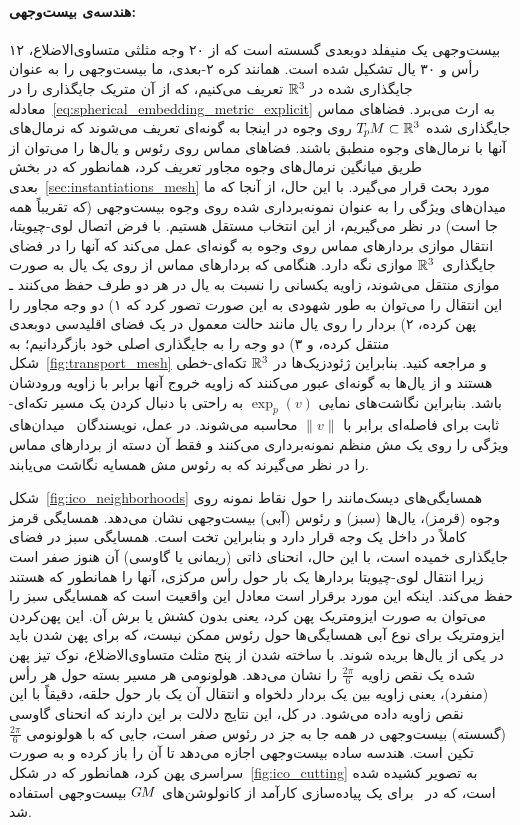 \paragraph{هندسه‌ی بیست‌وجهی:}
بیست‌وجهی یک منیفلد دوبعدی گسسته است که از ۲۰ وجه مثلثی متساوی‌الاضلاع، ۱۲ رأس و ۳۰ یال تشکیل شده است.
همانند کره ۲-بعدی، ما بیست‌وجهی را به عنوان جایگذاری شده در $\mathbb{R}^3$ تعریف می‌کنیم، که از آن متریک جایگذاری را در معادله~\eqref{eq:spherical_embedding_metric_explicit} به ارث می‌برد.
فضاهای مماس جایگذاری شده $T_{\mkern-1.5mu p}\mkern-.5muM \subset \mathbb{R}^3$ روی وجوه در اینجا به گونه‌ای تعریف می‌شوند که نرمال‌های آنها با نرمال‌های وجوه منطبق باشند.
فضاهای مماس روی رئوس و یال‌ها را می‌توان از طریق میانگین نرمال‌های وجوه مجاور تعریف کرد، همانطور که در بخش بعدی~\ref{sec:instantiations_mesh} مورد بحث قرار می‌گیرد.
با این حال، از آنجا که ما میدان‌های ویژگی را به عنوان نمونه‌برداری شده روی وجوه بیست‌وجهی (که تقریباً همه جا است) در نظر می‌گیریم، از این انتخاب مستقل هستیم.
با فرض اتصال لوی-چیویتا، انتقال موازی بردارهای مماس روی وجوه به گونه‌ای عمل می‌کند که آنها را در فضای جایگذاری~$\mathbb{R}^3$ موازی نگه دارد.
هنگامی که بردارهای مماس از روی یک یال به صورت موازی منتقل می‌شوند، زاویه یکسانی را نسبت به یال در هر دو طرف حفظ می‌کنند ـ این انتقال را می‌توان به طور شهودی به این صورت تصور کرد که ۱) دو وجه مجاور را پهن کرده، ۲) بردار را روی یال مانند حالت معمول در یک فضای اقلیدسی دوبعدی منتقل کرده، و ۳) دو وجه را به جایگذاری اصلی خود بازگردانیم؛ به شکل~\ref{fig:transport_mesh} و \cite{craneDiscreteDifferentialGeometry2014} مراجعه کنید.
بنابراین ژئودزیک‌ها در $\mathbb{R}^3$ تکه‌ای-خطی هستند و از یال‌ها به گونه‌ای عبور می‌کنند که زاویه خروج آنها برابر با زاویه ورودشان باشد.
بنابراین نگاشت‌های نمایی $\exp_p(v)$ به راحتی با دنبال کردن یک مسیر تکه‌ای-ثابت برای فاصله‌ای برابر با $\lVert v\rVert$ محاسبه می‌شوند.
در عمل، نویسندگان~\cite{liu2018icoAltAz,gaugeIco2019,zhang2019orientation} میدان‌های ویژگی را روی یک مش منظم نمونه‌برداری می‌کنند و فقط آن دسته از بردارهای مماس را در نظر می‌گیرند که به رئوس مش همسایه نگاشت می‌یابند.


شکل~\ref{fig:ico_neighborhoods} همسایگی‌های دیسک‌مانند را حول نقاط نمونه روی وجوه (قرمز)، یال‌ها (سبز) و رئوس (آبی) بیست‌وجهی نشان می‌دهد.
همسایگی قرمز کاملاً در داخل یک وجه قرار دارد و بنابراین تخت است.
همسایگی سبز در فضای جایگذاری خمیده است، با این حال، انحنای ذاتی (ریمانی یا گاوسی) آن هنوز صفر است زیرا انتقال لوی-چیویتا بردارها یک بار حول رأس مرکزی، آنها را همانطور که هستند حفظ می‌کند.
اینکه این مورد برقرار است معادل این واقعیت است که همسایگی سبز را می‌توان به صورت ایزومتریک پهن کرد، یعنی بدون کشش یا برش آن.
این پهن‌کردن ایزومتریک برای نوع آبی همسایگی‌ها حول رئوس ممکن نیست، که برای پهن شدن باید در یکی از یال‌ها بریده شوند.
با ساخته شدن از پنج مثلث متساوی‌الاضلاع، نوک تیز پهن شده یک نقص زاویه~$\frac{2\pi}{6}$ را نشان می‌دهد.
هولونومی هر مسیر بسته حول هر رأس (منفرد)، یعنی زاویه بین یک بردار دلخواه و انتقال آن یک بار حول حلقه، دقیقاً با این نقص زاویه داده می‌شود.
در کل، این نتایج دلالت بر این دارند که انحنای گاوسی (گسسته) بیست‌وجهی در همه جا به جز در رئوس صفر است، جایی که با هولونومی $\frac{2\pi}{6}$ تکین است.
هندسه ساده بیست‌وجهی اجازه می‌دهد تا آن را باز کرده و به صورت سراسری پهن کرد، همانطور که در شکل~\ref{fig:ico_cutting} به تصویر کشیده شده است، که در~\cite{liu2018icoAltAz,gaugeIco2019,zhang2019orientation} برای یک پیاده‌سازی کارآمد از کانولوشن‌های $G\mkern-1.4muM$ بیست‌وجهی استفاده شد.


